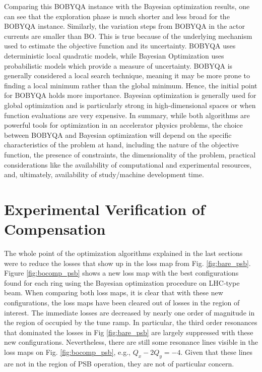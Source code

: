 Comparing this BOBYQA instance with the Bayesian optimization results, one can see that the exploration phase is much shorter and less broad for the BOBYQA instance. Similarly, the variation steps from BOBYQA in the actor currents are smaller than BO. This is true because of the underlying mechanism used to estimate the objective function and its uncertainty. BOBYQA uses deterministic local quadratic models, while Bayesian Optimization uses probabilistic models which provide a measure of uncertainty. BOBYQA is generally considered a local search technique, meaning it may be more prone to finding a local minimum rather than the global minimum. Hence, the initial point for BOBYQA holds more importance. Bayesian optimization is generally used for global optimization and is particularly strong in high-dimensional spaces or when function evaluations are very expensive. In summary, while both algorithms are powerful tools for optimization in an accelerator physics problems, the choice between BOBYQA and Bayesian optimization will depend on the specific characteristics of the problem at hand, including the nature of the objective function, the presence of constraints, the dimensionality of the problem, practical considerations like the availability of computational and experimental resources, and, ultimately, availability of study/machine development time.  

\section{Experimental Verification of Compensation}

The whole point of the optimization algorithms explained in the last sections were to reduce the losses that show up in the loss map from Fig. \ref{fig:bare_psb}. Figure \ref{fig:bocomp_psb} shows a new loss map with the best configurations found for each ring using the Bayesian optimization procedure on LHC-type beam. When comparing both loss maps, it is clear that with these new configurations, the loss maps have been cleared out of losses in the region of interest. The immediate losses are decreased by nearly one order of magnitude in the region of occupied by the tune ramp. In particular, the third order resonances that dominated the losses in Fig \ref{fig:bare_psb} are largely suppressed with these new configurations. Nevertheless, there are still some resonance lines visible in the loss maps on Fig. \ref{fig:bocomp_psb}, e.g., $Q_x - 2 Q_y = -4$. Given that these lines are not in the region of PSB operation, they are not of particular concern. 

